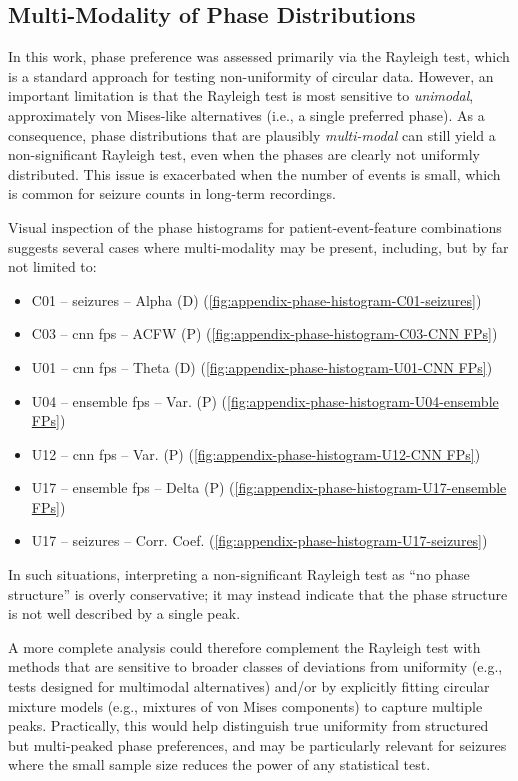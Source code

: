 \subsection{Multi-Modality of Phase Distributions}
In this work, phase preference was assessed primarily via the Rayleigh test, which is a standard approach for testing non-uniformity of circular data.
However, an important limitation is that the Rayleigh test is most sensitive to \emph{unimodal}, approximately von Mises-like alternatives (i.e., a single preferred phase).
As a consequence, phase distributions that are plausibly \emph{multi-modal} can still yield a non-significant Rayleigh test, even when the phases are clearly not uniformly distributed.
This issue is exacerbated when the number of events is small, which is common for seizure counts in long-term recordings.

Visual inspection of the phase histograms for patient-event-feature combinations suggests several cases where multi-modality may be present, including, but by far not limited to:
\begin{itemize}
    \item C01 -- seizures -- Alpha (D) (\cref{fig:appendix-phase-histogram-C01-seizures})
    \item C03 -- \gls{cnn} \glspl{fp} -- ACFW (P) (\cref{fig:appendix-phase-histogram-C03-CNN FPs})
    \item U01 -- \gls{cnn} \glspl{fp} -- Theta (D) (\cref{fig:appendix-phase-histogram-U01-CNN FPs})
    \item U04 -- ensemble \glspl{fp} -- Var. (P) (\cref{fig:appendix-phase-histogram-U04-ensemble FPs})
    \item U12 -- \gls{cnn} \glspl{fp} -- Var. (P) (\cref{fig:appendix-phase-histogram-U12-CNN FPs})
    \item U17 -- ensemble \glspl{fp} -- Delta (P) (\cref{fig:appendix-phase-histogram-U17-ensemble FPs})
    \item U17 -- seizures -- Corr. Coef. (\cref{fig:appendix-phase-histogram-U17-seizures})
\end{itemize}
In such situations, interpreting a non-significant Rayleigh test as ``no phase structure'' is overly conservative; it may instead indicate that the phase structure is not well described by a single peak.

A more complete analysis could therefore complement the Rayleigh test with methods that are sensitive to broader classes of deviations from uniformity (e.g., tests designed for multimodal alternatives) and/or by explicitly fitting circular mixture models (e.g., mixtures of von Mises components) to capture multiple peaks.
Practically, this would help distinguish true uniformity from structured but multi-peaked phase preferences, and may be particularly relevant for seizures where the small sample size reduces the power of any statistical test.
